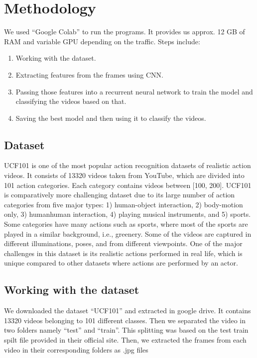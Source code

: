 \documentclass[a4paper,12pt]{article}
\begin{document}
\section{Methodology}
We used “Google Colab” to run the programs. It provides us approx. 12 GB of RAM and variable GPU depending on the traffic.
Steps include:
\begin{enumerate}
    \item Working with the dataset.
    \item Extracting features from the frames using CNN.
    \item Passing those features into a recurrent neural network to train the model and classifying the videos based on that.
    \item Saving the best model and then using it to classify the videos.
\end{enumerate}
\subsection{Dataset}
UCF101 is one of the most popular action recognition datasets of realistic action videos. It consists of 13320 videos taken from YouTube, which are divided into 101 action categories. Each category contains videos between [100, 200]. UCF101 is comparatively more challenging dataset due to its large number of action categories from five major types: 1) human-object interaction, 2) body-motion only, 3) humanhuman interaction, 4) playing musical instruments, and 5) sports. Some categories have many actions such as sports, where most of the sports are played in a similar background, i.e., greenery. Some of the videos are captured in different illuminations, poses, and from different viewpoints. One of the major challenges in this dataset is its realistic actions performed in real life, which is unique compared to other datasets where actions are performed by an actor. 
\subsection{Working with the dataset}
We downloaded the dataset “UCF101” and extracted in google drive. It contains 13320 videos belonging to 101 different classes. Then we separated the video in two folders namely “test” and “train”. This splitting was based on the test train spilt file provided in their official site. Then, we extracted the frames from each video in their corresponding folders as .jpg files
\end{document}

